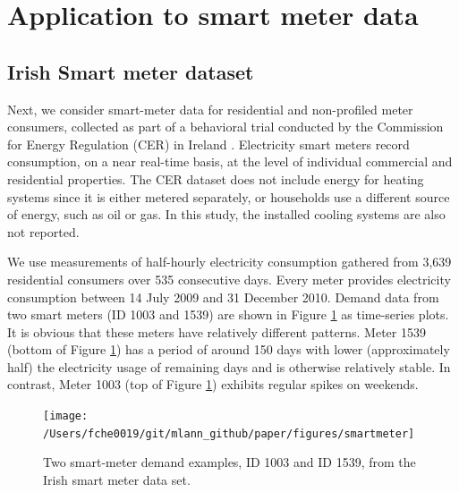 \documentclass[11pt,a4paper,]{article}
\begin{document}
\hypertarget{smartmeter}{%
\section{Application to smart meter data}\label{smartmeter}}

\hypertarget{irish-smart-meter-dataset}{%
\subsection{Irish Smart meter dataset}\label{irish-smart-meter-dataset}}

Next, we consider smart-meter data for residential and non-profiled meter consumers, collected as part of a behavioral trial conducted by the Commission for Energy Regulation (CER) in Ireland \autocite{cer2012-data}. Electricity smart meters record consumption, on a near real-time basis, at the level of individual commercial and residential properties. The CER dataset does not include energy for heating systems since it is either metered separately, or households use a different source of energy, such as oil or gas. In this study, the installed cooling systems are also not reported.

We use measurements of half-hourly electricity consumption gathered from 3,639 residential consumers over 535 consecutive days. Every meter provides electricity consumption between 14 July 2009 and 31 December 2010. Demand data from two smart meters (ID 1003 and 1539) are shown in Figure \ref{fig:smartmeter} as time-series plots. It is obvious that these meters have relatively different patterns. Meter 1539 (bottom of Figure \ref{fig:smartmeter}) has a period of around 150 days with lower (approximately half) the electricity usage of remaining days and is otherwise relatively stable. In contrast, Meter 1003 (top of Figure \ref{fig:smartmeter}) exhibits regular spikes on weekends.

\begin{figure}

{\centering \texttt{[image: /Users/fche0019/git/mlann\_github/paper/figures/smartmeter]} 

}

\caption{Two smart-meter demand examples, ID 1003 and ID 1539, from the Irish smart meter data set.}\label{fig:smartmeter}
\end{figure}
\end{document}

